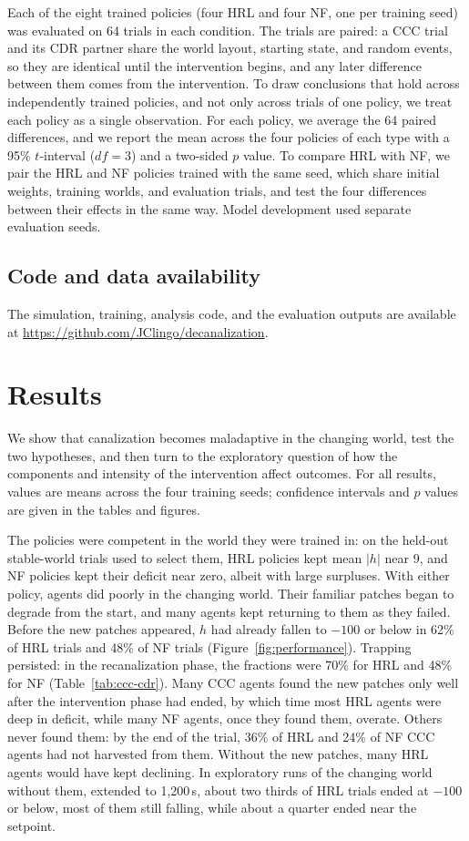 \documentclass[12pt,fleqn]{article}
\begin{document}
Each of the eight trained policies (four HRL and four NF, one per training seed) was evaluated on 64 trials in each condition. The trials are paired: a CCC trial and its CDR partner share the world layout, starting state, and random events, so they are identical until the intervention begins, and any later difference between them comes from the intervention. To draw conclusions that hold across independently trained policies, and not only across trials of one policy, we treat each policy as a single observation. For each policy, we average the 64 paired differences, and we report the mean across the four policies of each type with a 95\% $t$-interval ($df=3$) and a two-sided $p$ value. To compare HRL with NF, we pair the HRL and NF policies trained with the same seed, which share initial weights, training worlds, and evaluation trials, and test the four differences between their effects in the same way. Model development used separate evaluation seeds.

\subsection{Code and data availability}\label{sec:code}

The simulation, training, analysis code, and the evaluation outputs are available at \url{https://github.com/JClingo/decanalization}.

\section{Results}\label{model-results}

We show that canalization becomes maladaptive in the changing world, test the two hypotheses, and then turn to the exploratory question of how the components and intensity of the intervention affect outcomes. For all results, values are means across the four training seeds; confidence intervals and $p$ values are given in the tables and figures.

The policies were competent in the world they were trained in: on the held-out stable-world trials used to select them, HRL policies kept mean $|h|$ near 9, and NF policies kept their deficit near zero, albeit with large surpluses. With either policy, agents did poorly in the changing world. Their familiar patches began to degrade from the start, and many agents kept returning to them as they failed. Before the new patches appeared, $h$ had already fallen to $-100$ or below in 62\% of HRL trials and 48\% of NF trials (Figure~\ref{fig:performance}). Trapping persisted: in the recanalization phase, the fractions were 70\% for HRL and 48\% for NF (Table~\ref{tab:ccc-cdr}). Many CCC agents found the new patches only well after the intervention phase had ended, by which time most HRL agents were deep in deficit, while many NF agents, once they found them, overate. Others never found them: by the end of the trial, 36\% of HRL and 24\% of NF CCC agents had not harvested from them. Without the new patches, many HRL agents would have kept declining. In exploratory runs of the changing world without them, extended to 1,200\,s, about two thirds of HRL trials ended at $-100$ or below, most of them still falling, while about a quarter ended near the setpoint.
\end{document}
